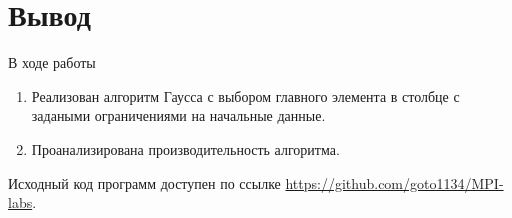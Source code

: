 	\section{Вывод}
		В ходе работы
		\begin{enumerate}
			\item Реализован алгоритм Гаусса с выбором главного элемента в столбце с задаными ограничениями на начальные данные.
			\item Проанализирована производительность алгоритма.
		\end{enumerate}
	
		Исходный код программ доступен по ссылке \href{https://github.com/goto1134/MPI-labs}{https://github.com/goto1134/MPI-labs}.